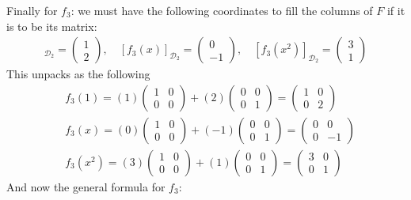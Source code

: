 {\noindent Finally for $f_3$: we must have the following coordinates to fill the columns of $F$ if it is to be its matrix:
\begin{align*}
[f_3(1)]_{\mathcal{D}_2} = \begin{pmatrix} 1 \\ 2 \end{pmatrix}, \quad [f_3(x)]_{\mathcal{D}_2} = \begin{pmatrix} 0 \\-1 \end{pmatrix}, \quad [f_3(x^2)]_{\mathcal{D}_2} = \begin{pmatrix} 3 \\ 1 \end{pmatrix}
\end{align*}
This unpacks as the following
\begin{align*}
& f_3(1) = (1)\begin{pmatrix} 1 & 0 \\ 0 & 0 \end{pmatrix} + (2)\begin{pmatrix} 0 & 0 \\ 0 & 1 \end{pmatrix} = \begin{pmatrix} 1 & 0 \\ 0 & 2 \end{pmatrix} \\
& f_3(x) = (0)\begin{pmatrix} 1 & 0 \\ 0 & 0 \end{pmatrix} + (-1)\begin{pmatrix} 0 & 0 \\ 0 & 1 \end{pmatrix} = \begin{pmatrix} 0 & 0 \\ 0 & -1 \end{pmatrix} \\
& f_3(x^2) = (3)\begin{pmatrix} 1 & 0 \\ 0 & 0 \end{pmatrix} + (1)\begin{pmatrix} 0 & 0 \\ 0 & 1 \end{pmatrix} = \begin{pmatrix} 3 & 0 \\ 0 & 1 \end{pmatrix}
\end{align*}
And now the general formula for $f_3$:
}
